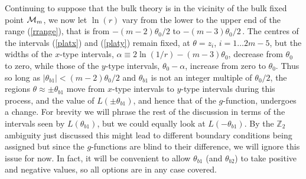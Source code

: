 \documentclass[11pt]{article}
\newcommand\ZZ{{\mathbb Z}}
\newcommand{\CM}{{\cal M}}
\newcommand{\tbi}{\theta_{b1}}
\newcommand{\tbii}{\theta_{b2}}
\newcommand{\tz}{\theta_0}
\begin{document}
\medskip

Continuing to suppose that the bulk theory is in 
the vicinity of the bulk fixed point $\CM_m$, we now
let $\ln(r)$ vary from the lower to the upper end of
the range (\ref{rrange}), that is from 
$-(m{-}2)\tz/2$ to $-(m{-}3)\tz/2$\,. 
The centres of the intervals (\ref{platx}) and (\ref{platy}) 
remain fixed, at $\theta=z_i$, $i=1\dots 2m{-}5$,
but the widths of the $x$-type intervals,
$\alpha\equiv 2\ln(1/r)-(m{-}3)\tz$,
decrease from $\tz$ to zero, while those of the $y$-type intervals,
$\tz-\alpha$, increase from zero to $\tz$. Thus so long as
$|\tbi|< (m{-}2)\tz/2$ and $\tbi$ 
is not an integer multiple of $\tz/2$, the regions
$\theta\approx\pm\tbi$ 
move from $x$-type intervals to $y$-type
intervals during this process, and the value of $L(\pm\tbi)$, and hence
that of the $g$-function, undergoes a change. For brevity we will
phrase the rest of the discussion in terms of the intervals seen by
$L(\tbi)$, but we could equally look at
$L(-\tbi)$. By the $\ZZ_2$ ambiguity just discussed this
might lead to different boundary conditions being assigned but since
the $g$-functions are blind to their difference, we will ignore
this issue for now. In fact, it will be convenient to allow $\tbi$
(and $\tbii$) to take positive and negative values, so all options are
in any case covered.
\end{document}
